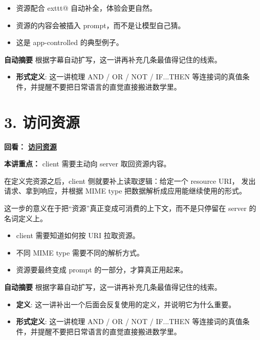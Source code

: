 \documentclass[UTF8,a4paper,11pt]{ctexart}
\newcommand{\videolink}[2]{%
  \href{#1}{\textcolor{videoblue}{\textbf{#2}}}%
}
\begin{document}
\begin{itemize}
  \item 资源配合 	exttt{@} 自动补全，体验会更自然。
  \item 资源的内容会被插入 prompt，而不是让模型自己猜。
  \item 这是 app-controlled 的典型例子。
\end{itemize}

\begin{keyconcept}
\textbf{自动摘要}
根据字幕自动扩写，这一讲再补充几条最值得记住的线索。
\begin{itemize}
  \item \textbf{形式定义}: 这一讲梳理 AND / OR / NOT / IF...THEN 等连接词的真值条件，并提醒不要把日常语言的直觉直接搬进数学里。
\end{itemize}
\end{keyconcept}

\section*{3. 访问资源}
\noindent\textbf{回看：}\videolink{https://www.coursera.org/learn/introduction-to-model-context-protocol/home/module/3}{访问资源}

\textbf{本讲重点：} client 需要主动向 server 取回资源内容。

在定义完资源之后，client 侧就要补上读取逻辑：给定一个 resource URI，
发出请求、拿到响应，并根据 MIME type 把数据解析成应用能继续使用的形式。

这一步的意义在于把“资源”真正变成可消费的上下文，而不是只停留在 server 的名词定义上。

\begin{itemize}
  \item client 需要知道如何按 URI 拉取资源。
  \item 不同 MIME type 需要不同的解析方式。
  \item 资源要最终变成 prompt 的一部分，才算真正用起来。
\end{itemize}

\begin{keyconcept}
\textbf{自动摘要}
根据字幕自动扩写，这一讲再补充几条最值得记住的线索。
\begin{itemize}
  \item \textbf{定义}: 这一讲补出一个后面会反复使用的定义，并说明它为什么重要。
  \item \textbf{形式定义}: 这一讲梳理 AND / OR / NOT / IF...THEN 等连接词的真值条件，并提醒不要把日常语言的直觉直接搬进数学里。
\end{itemize}
\end{keyconcept}
\end{document}
